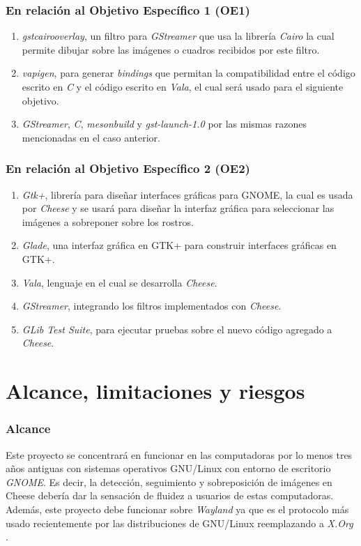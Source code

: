 \documentclass[a4paper,openright,12pt]{report}
\begin{document}
\subsubsection{En relación al Objetivo Específico 1 (OE1)}
\begin{enumerate}
    \item \textit{gstcairooverlay}, un filtro para \textit{GStreamer} que usa
        la librería \textit{Cairo} la cual permite dibujar sobre las imágenes o
        cuadros recibidos por este filtro.
    \item \textit{vapigen}, para generar \textit{bindings} que permitan la
        compatibilidad entre el código escrito en \textit{C} y el código escrito
        en \textit{Vala}, el cual será usado para el siguiente objetivo.
    \item \textit{GStreamer}, \textit{C}, \textit{mesonbuild} y
        \textit{gst-launch-1.0} por las mismas razones mencionadas en el caso
        anterior.
\end{enumerate}

\subsubsection{En relación al Objetivo Específico 2 (OE2)}
\begin{enumerate}
    \item \textit{Gtk+}, librería para diseñar interfaces gráficas para GNOME,
        la cual es usada por \textit{Cheese} y se usará para diseñar la
        interfaz gráfica para seleccionar las imágenes a sobreponer sobre
        los rostros.
    \item \textit{Glade}, una interfaz gráfica en GTK+ para construir interfaces
        gráficas en GTK+.
    \item \textit{Vala}, lenguaje en el cual se desarrolla \textit{Cheese}.
    \item \textit{GStreamer}, integrando los filtros implementados con
        \textit{Cheese}.
    \item \textit{GLib Test Suite}, para ejecutar pruebas sobre el nuevo código
        agregado a \textit{Cheese}.
\end{enumerate}

\section{Alcance, limitaciones y riesgos}

\subsubsection{Alcance}
    Este proyecto se concentrará en funcionar en las computadoras por lo menos
    tres años antiguas con sistemas operativos GNU/Linux con entorno de
    escritorio \textit{GNOME}. Es decir, la detección, seguimiento y
    sobreposición de imágenes en Cheese debería dar la sensación de fluidez a
    usuarios de estas computadoras. Además, este proyecto debe funcionar sobre
    \textit{Wayland} ya que es el protocolo más usado recientemente por las
    distribuciones de GNU/Linux reemplazando a \textit{X.Org}
    \cite{LinuxMagazineWaylandStrong}.
\end{document}

